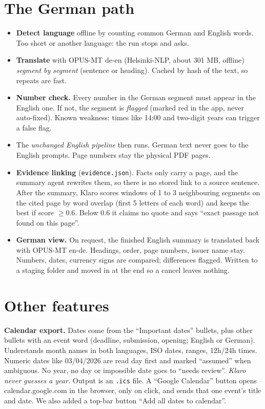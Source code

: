 \section{The German path}
\begin{itemize}
\item \textbf{Detect language} offline by counting common German and English words. Too short or another language: the run stops and asks.
\item \textbf{Translate} with OPUS-MT de-en (Helsinki-NLP, about 301 MB, offline) \emph{segment by segment} (sentence or heading). Cached by hash of the text, so repeats are fast.
\item \textbf{Number check.} Every number in the German segment must appear in the English one. If not, the segment is \emph{flagged} (marked red in the app, never auto-fixed). Known weakness: times like 14:00 and two-digit years can trigger a false flag.
\item The \emph{unchanged English pipeline} then runs. German text never goes to the English prompts. Page numbers stay the physical PDF pages.
\item \textbf{Evidence linking} (\texttt{evidence.json}). Facts only carry a page, and the summary agent rewrites them, so there is no stored link to a source sentence. After the summary, Klaro scores windows of 1 to 3 neighbouring segments on the cited page by word overlap (first 5 letters of each word) and keeps the best if score $\ge 0.6$. Below 0.6 it claims no quote and says ``exact passage not found on this page''.
\item \textbf{German view.} On request, the finished English summary is translated back with OPUS-MT en-de. Headings, order, page numbers, issuer name stay. Numbers, dates, currency signs are compared; differences flagged. Written to a staging folder and moved in at the end so a cancel leaves nothing.
\end{itemize}

\section{Other features}
\textbf{Calendar export.} Dates come from the ``Important dates'' bullets, plus other bullets with an event word (deadline, submission, opening; English or German). Understands month names in both languages, ISO dates, ranges, 12h/24h times. Numeric dates like 03/04/2026 are read day first and marked ``assumed'' when ambiguous. No year, no day or impossible date goes to ``needs review''. \emph{Klaro never guesses a year.} Output is an \texttt{.ics} file. A ``Google Calendar'' button opens calendar.google.com in the browser, only on click, and sends that one event's title and date. We also added a top-bar button ``Add all dates to calendar''.

